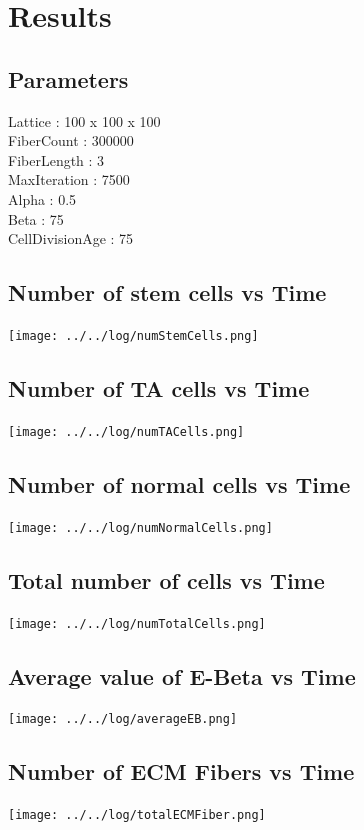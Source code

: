 \documentclass[11pt]{report}
\begin{document}
 \chapter{Results}
 \section{Parameters}
 Lattice : 100 x 100 x 100 \\
 FiberCount : 300000 \\
 FiberLength : 3 \\
 MaxIteration : 7500 \\
 Alpha : 0.5 \\
 Beta : 75 \\
 CellDivisionAge : 75 \\
 
 \section{Number of stem cells vs Time}
 \texttt{[image: ../../log/numStemCells.png]}
 
 \section{Number of TA cells vs Time}
 \texttt{[image: ../../log/numTACells.png]}
 
 \section{Number of normal cells vs Time}
 \texttt{[image: ../../log/numNormalCells.png]}
 
 \section{Total number of cells vs Time}
 \texttt{[image: ../../log/numTotalCells.png]}
 
 \section{Average value of E-Beta vs Time}
 \texttt{[image: ../../log/averageEB.png]}
 
 \section{Number of ECM Fibers vs Time}
 \texttt{[image: ../../log/totalECMFiber.png]}


 
 
\end{document}
